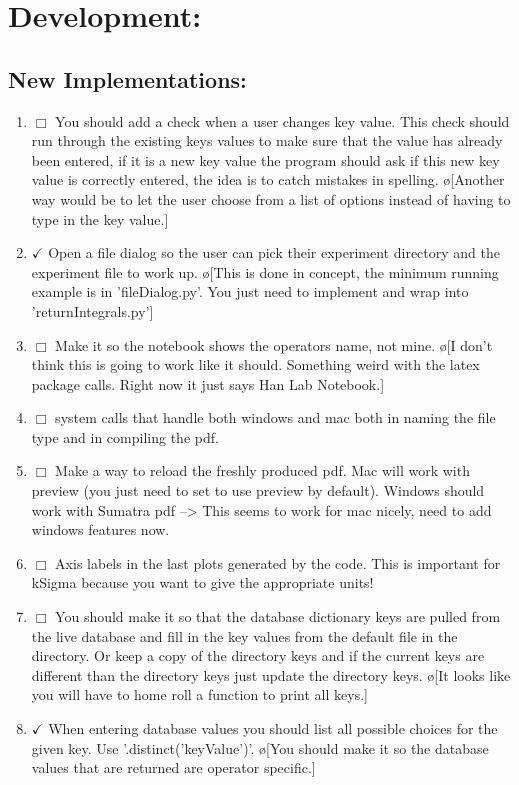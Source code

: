 \documentclass[10pt]{book}
\begin{document}
\section{Development:}
\subsection{New Implementations:}
\begin{enumerate}
    \item $\Box$ You should add a check when a user changes key value. This check should run through the existing keys values to make sure that the value has already been entered, if it is a new key value the program should ask if this new key value is correctly entered, the idea is to catch mistakes in spelling. \o[Another way would be to let the user choose from a list of options instead of having to type in the key value.]
    \item $\checkmark$ Open a file dialog so the user can pick their experiment directory and the experiment file to work up. \o[This is done in concept, the minimum running example is in 'fileDialog.py'. You just need to implement and wrap into 'returnIntegrals.py']
    \item $\Box$ Make it so the notebook shows the operators name, not mine. \o[I don't think this is going to work like it should. Something weird with the latex package calls. Right now it just says Han Lab Notebook.]
    \item $\Box$ system calls that handle both windows and mac both in naming the file type and in compiling the pdf.
    \item $\Box$ Make a way to reload the freshly produced pdf. Mac will work with preview (you just need to set to use preview by default). Windows should work with Sumatra pdf --> This seems to work for mac nicely, need to add windows features now.
    \item $\Box$ Axis labels in the last plots generated by the code. This is important for kSigma because you want to give the appropriate units!
    \item $\Box$ You should make it so that the database dictionary keys are pulled from the live database and fill in the key values from the default file in the directory. Or keep a copy of the directory keys and if the current keys are different than the directory keys just update the directory keys. \o[It looks like you will have to home roll a function to print all keys.]{}
    \item $\checkmark$ When entering database values you should list all possible choices for the given key. Use '.distinct('keyValue')'. \o[You should make it so the database values that are returned are operator specific.]{}

\end{enumerate}
\end{document}
